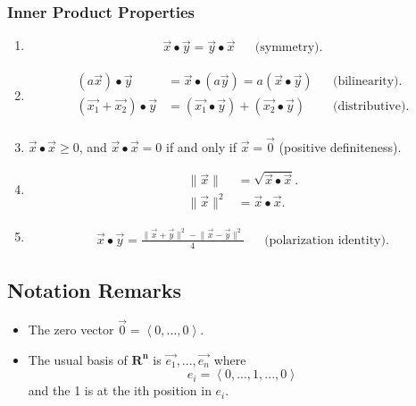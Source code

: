 \documentclass{article}
\begin{document}
	\subsubsection{Inner Product Properties}
	\begin{enumerate}
		\item \begin{align*}
			\vec{x}\bullet\vec{y} = \vec{y}\bullet\vec{x} && \text{(symmetry).}
		\end{align*}
		
		\item 
		\begin{align*}
		\left( a\vec{x} \right) \bullet \vec{y} &= \vec{x} \bullet \left( a\vec{y}\right) = a\left(\vec{x}\bullet\vec{y}\right) && \text{(bilinearity).}\\
		\left( \vec{x_1} + \vec{x_2}\right) \bullet \vec{y} &= \left(\vec{x_1}\bullet\vec{y}\right) + \left(\vec{x_2}\bullet\vec{y}\right) && \text{(distributive).}\\
		\end{align*}
		
		\item $\vec{x}\bullet\vec{x} \geq 0$, and $\vec{x}\bullet\vec{x}=0$ if and only if $\vec{x} = \vec{0}$ (positive definiteness).
		
		\item \begin{align*}
		\lVert\vec{x}\rVert &= \sqrt{\vec{x}\bullet\vec{x}}.\\
		\lVert\vec{x}\rVert^2 &= \vec{x}\bullet\vec{x}.
		\end{align*}
		
		\item \begin{align*}
		\vec{x}\bullet\vec{y} = \frac{\lVert\vec{x}+\vec{y}\rVert^2 - \lVert\vec{x}-\vec{y}\rVert^2}{4} && \text{(polarization identity).}
		\end{align*}
	\end{enumerate}
	
	\subsection{Notation Remarks}
	\begin{itemize}
		\item The zero vector $\vec{0} = \left<0, ..., 0\right>$.
		\item The usual basis of $\mathbf{R^n}$ is $\vec{e_1}, ..., \vec{e_n}$ where
		\begin{equation*}
			e_i = \left<0, ..., 1, ..., 0\right>
		\end{equation*}
		and the 1 is at the ith position in $e_i$.
	\end{itemize}
	\newpage
	
\end{document}

